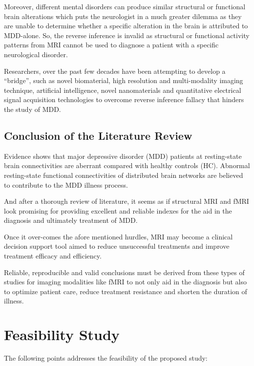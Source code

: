 \documentclass{article}
\begin{document}
Moreover, different mental disorders can produce similar structural or
functional brain alterations which puts the neurologist in a much
greater dilemma as they are unable to determine whether a specific
alteration in the brain is attributed to MDD-alone.  So, the reverse
inference is invalid as structural or functional activity patterns
from MRI cannot be used to diagnose a patient with a specific
neurological disorder.

Researchers, over the past few decades have been attempting to develop
a “bridge”, such as novel biomaterial, high resolution and
multi-modality imaging technique, artificial intelligence, novel
nanomaterials and quantitative electrical signal acquisition
technologies to overcome reverse inference fallacy that hinders the
study of MDD.

\subsection*{Conclusion of the Literature Review}

Evidence shows that major depressive disorder (MDD) patients at
resting-state brain connectivities are aberrant compared with healthy
controls (HC). Abnormal resting-state functional connectivities of
distributed brain networks are believed to contribute to the MDD
illness process.

And after a thorough review of literature, it seems as if structural
MRI and fMRI look promising for providing excellent and reliable
indexes for the aid in the diagnosis and ultimately treatment of MDD.

Once it over-comes the afore mentioned hurdles, MRI may become a
clinical decision support tool aimed to reduce unsuccessful treatments
and improve treatment efficacy and efficiency.

Reliable, reproducible and valid conclusions must be derived from
these types of studies for imaging modalities like fMRI to not only
aid in the diagnosis but also to optimize patient care, reduce
treatment resistance and shorten the duration of illness.

\section{Feasibility Study}

The following points addresses the feasibility of the proposed study:
\end{document}
